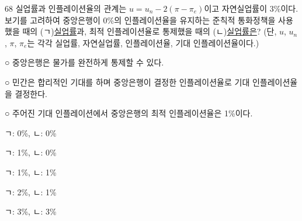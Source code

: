 \begin{question}{68}
실업률과 인플레이션율의 관계는 $u=u_n-2(\pi-\pi_e)$이고 자연실업률이 3\%이다. 보기를 고려하여 중앙은행이 0\%의 인플레이션율을 유지하는 준칙적 통화정책을 사용했을 때의 (ㄱ)\uline{실업률}과, 최적 인플레이션율로 통제했을 때의 (ㄴ)\uline{실업률은}? (단, $u$, $u_n$, $\pi$, $\pi_e$는 각각 실업률, 자연실업률, 인플레이션율, 기대 인플레이션율이다.)
\begin{bogi}
○ 중앙은행은 물가를 완전하게 통제할 수 있다. \par
○ 민간은 합리적인 기대를 하며 중앙은행이 결정한 인플레이션율로 기대 인플레이션율을 결정한다. \par
○ 주어진 기대 인플레이션에서 중앙은행의 최적 인플레이션율은 1\%이다. \par
\end{bogi}
\begin{choices}
  \item ㄱ: 0\%, ㄴ: 0\%
  \item ㄱ: 1\%, ㄴ: 0\%
  \item ㄱ: 1\%, ㄴ: 1\%
  \item ㄱ: 2\%, ㄴ: 1\%
  \item ㄱ: 3\%, ㄴ: 3\%
\end{choices}
\end{question}
